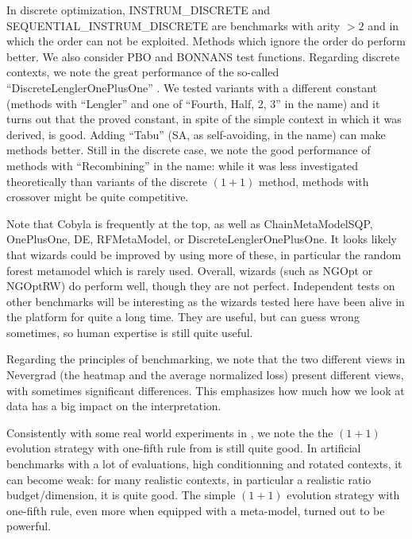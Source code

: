 
In discrete optimization, INSTRUM\_DISCRETE and SEQUENTIAL\_INSTRUM\_DISCRETE are benchmarks with arity $> 2$ and in
which the order can not be exploited. Methods which ignore the order do perform better.
We also consider PBO and BONNANS test functions. Regarding discrete contexts, we note the great performance of the so-called ``DiscreteLenglerOnePlusOne''
\cite{lengler}. We tested variants with a different constant (methods with ``Lengler'' and one of ``Fourth, Half, 2, 3''
in the name) and it turns out that the proved constant, in spite of the simple context in which it was derived, is good.
Adding ``Tabu'' (SA, as self-avoiding, in the name) can make methods better.
Still in the discrete case, we note the good performance of methods with ``Recombining'' in the name: while it was less
investigated theoretically than variants of the discrete $(1+1)$ method, methods with crossover might be quite
competitive.

Note that Cobyla is frequently at the top, as well as ChainMetaModelSQP, OnePlusOne, DE, RFMetaModel, or DiscreteLenglerOnePlusOne.
It looks likely that wizards could be improved by using more of these, in particular the random forest metamodel which
is rarely used.
Overall, wizards (such as NGOpt or NGOptRW) do perform well, though they are not perfect. Independent tests on other
benchmarks will be interesting as the wizards tested here have been alive in the platform for quite a long time. They
are useful, but can guess wrong sometimes, so human expertise is still quite useful.

Regarding the principles of benchmarking, we note that the two different views in Nevergrad (the heatmap and the average
normalized loss) present different views, with sometimes significant differences. This emphasizes how much how we look at data has a big impact on the interpretation.

%
%
%
%

Consistently with some real world experiments in \cite{micropredictions1,micropredictions2}, we note the the $(1+1)$ evolution strategy with one-fifth rule from \cite{rechenberg73} is still quite good. In artificial benchmarks with a lot of evaluations, high conditionning and rotated contexts, it can become weak: for many realistic contexts, in particular a realistic ratio budget/dimension, it is quite good.
The simple $(1+1)$ evolution strategy with one-fifth rule, even more when equipped with a meta-model, turned out to be powerful.

